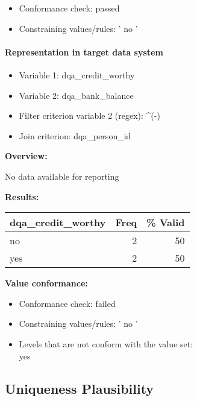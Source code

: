 \documentclass[
]{article}
\providecommand{\tightlist}{%
  \setlength{\itemsep}{0pt}\setlength{\parskip}{0pt}}
\begin{document}
\begin{itemize}
\tightlist
\item
  Conformance check: passed
\item
  Constraining values/rules: ' no '
\end{itemize}

\hypertarget{representation-in-target-data-system-12}{%
\paragraph{Representation in target data
system}\label{representation-in-target-data-system-12}}

\begin{itemize}
\tightlist
\item
  Variable 1: dqa\_credit\_worthy
\item
  Variable 2: dqa\_bank\_balance
\item
  Filter criterion variable 2 (regex): \^{}(-)
\item
  Join criterion: dqa\_person\_id
\end{itemize}

\textbf{Overview:}

No data available for reporting

\textbf{Results:}\\

\begin{table}[H]
\centering
\begin{tabular}{l|r|r}
\hline
\textbf{dqa\_credit\_worthy} & \textbf{Freq} & \textbf{\% Valid}\\
\hline
no & 2 & 50\\
\hline
yes & 2 & 50\\
\hline
\end{tabular}
\end{table}

\textbf{Value conformance:}

\begin{itemize}
\tightlist
\item
  Conformance check: failed
\item
  Constraining values/rules: ' no '
\item
  Levels that are not conform with the value set:\\
  yes
\end{itemize}

\hypertarget{uniqueness-plausibility}{%
\subsection{Uniqueness Plausibility}\label{uniqueness-plausibility}}
\end{document}
